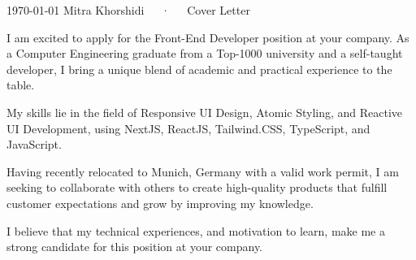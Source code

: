 
\makecvheader[L]

\makecvfooter
  {\today}
  {Mitra Khorshidi~~~·~~~Cover Letter}
  {}

\makelettertitle

\begin{cvletter}

  I am excited to apply for the Front-End Developer position at your company. As a Computer Engineering 
  graduate from a Top-1000 university and a self-taught developer, 
  I bring a unique blend of academic and practical experience to the table.
  
  My skills lie in the field of Responsive UI Design, Atomic Styling, and Reactive UI Development, 
  using NextJS, ReactJS, Tailwind.CSS, TypeScript, and JavaScript.
  
  Having recently relocated to Munich, Germany with a valid work permit, 
  I am seeking to collaborate with others to create high-quality products 
  that fulfill customer expectations and grow by improving my knowledge.
  
  I believe that my technical experiences, and motivation to learn, make me a strong candidate 
  for this position at your company.
  

\end{cvletter}
